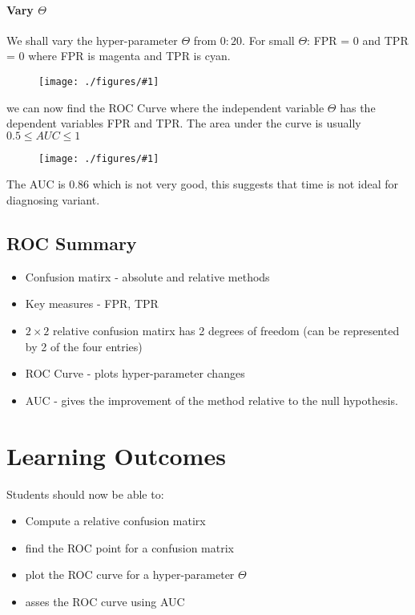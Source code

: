 \documentclass[12pt]{book}
\newcommand{\incimg}[2]{%
       \begin{figure}[h]
               \centering
               \texttt{[image: ./figures/\#1]}
       \end{figure}
}
\begin{document}
\paragraph{Vary $\Theta$}
We shall vary the hyper-parameter $\Theta$ from $0:20$. For small $\Theta$: FPR = 0 and TPR = 0
where FPR is magenta and TPR is cyan.
\incimg{fprtpr}{0.5}

we can now find the ROC Curve where the independent variable $\Theta$ has the dependent
variables FPR and TPR. The area under the curve is usually $0.5 \leq AUC \leq 1$
\incimg{ROCCurve}{0.4}

The AUC is 0.86 which is not very good, this suggests that time is not ideal for 
diagnosing variant.

\subsection*{ROC Summary}
\begin{itemize}
        \item Confusion matirx - absolute and relative methods
        \item Key measures - FPR, TPR
        \item $2 \times 2$ relative confusion matirx has 2 degrees of freedom (can be represented 
                by 2 of the four entries)
        \item ROC Curve - plots hyper-parameter changes
        \item AUC - gives the improvement of the method relative to the null hypothesis.
\end{itemize}

\section*{Learning Outcomes}
Students should now be able to:
\begin{itemize}
        \item Compute a relative confusion matirx
        \item find the ROC point for a confusion matrix
        \item plot the ROC curve for a hyper-parameter $\Theta$
        \item asses the ROC curve using AUC
\end{itemize}
\end{document}
